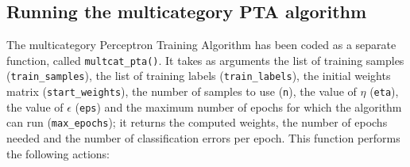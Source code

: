 \documentclass[letterpaper,headings=standardclasses]{scrartcl}
\begin{document}
\subsection{Running the multicategory PTA algorithm}

The multicategory Perceptron Training Algorithm has been coded as a separate function, called \texttt{multcat\_pta()}. It takes as arguments the list of training samples (\texttt{train\_samples}), the list of training labels (\texttt{train\_labels}), the initial weights matrix (\texttt{start\_weights}), the number of samples to use (\texttt{n}), the value of $\eta$ (\texttt{eta}), the value of $\epsilon$ (\texttt{eps}) and the maximum number of epochs for which the algorithm can run (\texttt{max\_epochs}); it returns the computed weights, the number of epochs needed and the number of classification errors per epoch. This function performs the following actions:
\end{document}
